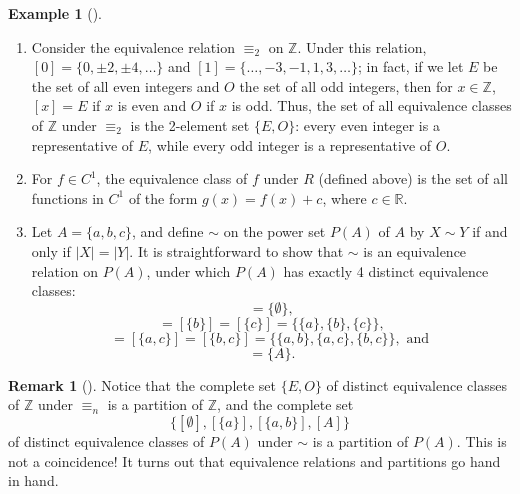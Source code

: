 \documentclass[10pt,openany,oneside]{book}
\theoremstyle{plain}
\theoremstyle{definition}
\theoremstyle{definition}
\newtheorem{remark}[theorem]{Remark}
\theoremstyle{definition}
\newtheorem{example}[theorem]{Example}
\theoremstyle{definition}
\numberwithin{equation}{section}
\def\Z{\mathbb{Z}}
\def\R{\mathbb{R}}
\begin{document}
\begin{example}[]\label{example-65}
\leavevmode%
\begin{enumerate}
\item\hypertarget{li-402}{}Consider the equivalence relation \(\equiv_2\) on \(\Z\).  Under this relation, \([0]=\{0,\pm 2, \pm 4, \ldots\}\) and \([1]=\{\ldots, -3, -1, 1, 3, \ldots\}\); in fact, if we let \(E\) be the set of all even integers and \(O\) the set of all odd integers, then for \(x\in \Z\), \([x]=E\) if \(x\) is even and \(O\) if \(x\) is odd. Thus, the set of all equivalence classes of \(\Z\) under \(\equiv_2\) is the 2-element set \(\{E,O\}\): every even integer is a representative of \(E\), while every odd integer is a representative of \(O\).%
\item\hypertarget{li-403}{}For \(f\in C^1\), the equivalence class of \(f\) under \(R\) (defined above) is the set of all functions in \(C^1\) of the form \(g(x)=f(x)+c\), where \(c\in \R\).%
\item\hypertarget{li-404}{}Let \(A=\{a,b,c\}\), and define \(\sim\) on the power set \(P(A)\) of \(A\) by \(X\sim Y\) if and only if \(|X|=|Y|\). It is straightforward to show that \(\sim\) is an equivalence relation on \(P(A)\), under which \(P(A)\) has exactly 4 distinct equivalence classes:%
\begin{equation*}
[\emptyset]=\{\emptyset\},
\end{equation*}
%
\begin{equation*}
[\{a\}]=[\{b\}]=[\{c\}]=\{\{a\},\{b\}, \{c\}\},
\end{equation*}
%
\begin{equation*}
[\{a,b\}]=[\{a,c\}]=[\{b,c\}]=\{\{a,b\},\{a,c\},\{b,c\}\}, \text{ and }
\end{equation*}
%
\begin{equation*}
[A]=\{A\}.
\end{equation*}
%
\end{enumerate}
%
\end{example}
\begin{remark}[]\label{remark-37}
Notice that the complete set \(\{E,O\}\) of distinct equivalence classes of \(\Z\) under \(\equiv_n\) is a partition of \(\Z\), and the complete set%
\begin{equation*}
\{[\emptyset],[\{a\}],[\{a,b\}],[A]\}
\end{equation*}
of distinct equivalence classes of \(P(A)\) under \(\sim\) is a partition of \(P(A)\). This is not a coincidence! It turns out that equivalence relations and partitions go hand in hand.%
\end{remark}
\end{document}

